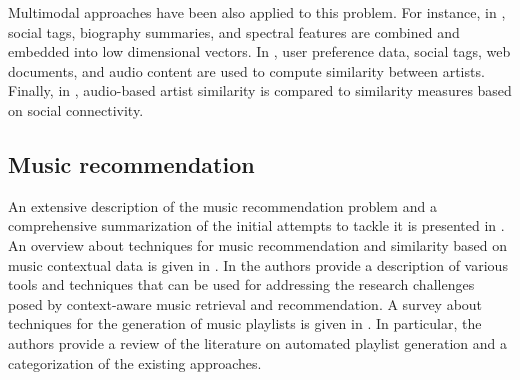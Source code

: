 Multimodal approaches have been also applied to this problem. For instance, in \cite{mcfee2009heterogeneous}, social tags, biography summaries, and spectral features are combined and embedded into low dimensional vectors. In \cite{kim2009using}, user preference data, social tags, web documents, and audio content are used to compute similarity between artists. Finally, in \cite{fields2008you}, audio-based artist similarity is compared to similarity measures based on social connectivity.

\subsection{Music recommendation}
\label{sec:SOA:mir:music-recommendation}

An extensive description of the music recommendation problem and a comprehensive summarization of the initial attempts to tackle it is presented in \cite{oscarBook}. An overview about techniques for music recommendation and similarity based on music contextual data is given in \cite{Knees2013}. 
In \cite{KaminskasR12} the authors provide a description of various tools and techniques that can be used for addressing the research
challenges posed by context-aware music retrieval and recommendation. 
A survey about techniques for the generation of music playlists is given in \cite{Bonnin2014}. In particular, the authors provide a review of the literature on automated playlist generation and a categorization of the existing approaches. 



